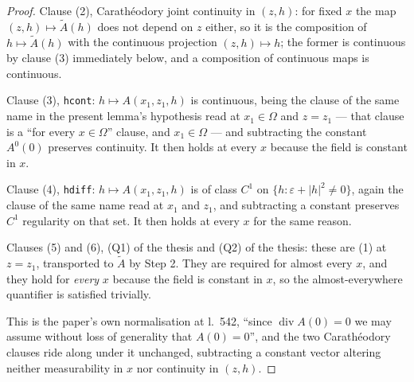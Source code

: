 \begin{proof}
Clause (2), Carath\'eodory joint continuity in $(z,h)$: for fixed $x$ the map
$(z,h)\mapsto\widetilde A(h)$ does not depend on $z$ either, so it is the
composition of $h\mapsto\widetilde A(h)$ with the continuous projection
$(z,h)\mapsto h$; the former is continuous by clause (3) immediately below, and
a composition of continuous maps is continuous.

Clause (3), \texttt{hcont}: $h\mapsto A(x_1,z_1,h)$ is continuous, being the
clause of the same name in the present lemma's 
hypothesis read at $x_1\in\Omega$ and $z=z_1$ --- that clause is a ``for every
$x\in\Omega$'' clause, and $x_1\in\Omega$ --- and subtracting the constant
$A^0(0)$ preserves continuity.  It then holds at every $x$ because the field is
constant in $x$.

Clause (4), \texttt{hdiff}: $h\mapsto A(x_1,z_1,h)$ is of class $C^1$ on
$\{h:\varepsilon+|h|^2\ne0\}$, again the clause of the same name read at $x_1$
and $z_1$, and subtracting a constant preserves $C^1$ regularity on that set.
It then holds at every $x$ for the same reason.

Clauses (5) and (6), (Q1) of the thesis and (Q2) of the thesis: these are (1) at $z=z_1$,
transported to $\widetilde A$ by Step 2.  They are required for almost every
$x$, and they hold for \emph{every} $x$ because the field is constant in $x$,
so the almost-everywhere quantifier is satisfied trivially.

This is the paper's own normalisation at l.~542, ``since
$\operatorname{div}A(0)=0$ we may assume without loss of generality that
$A(0)=0$'', and the two Carath\'eodory clauses ride along under it unchanged,
subtracting a constant vector altering neither measurability in $x$ nor
continuity in $(z,h)$.
\end{proof}
